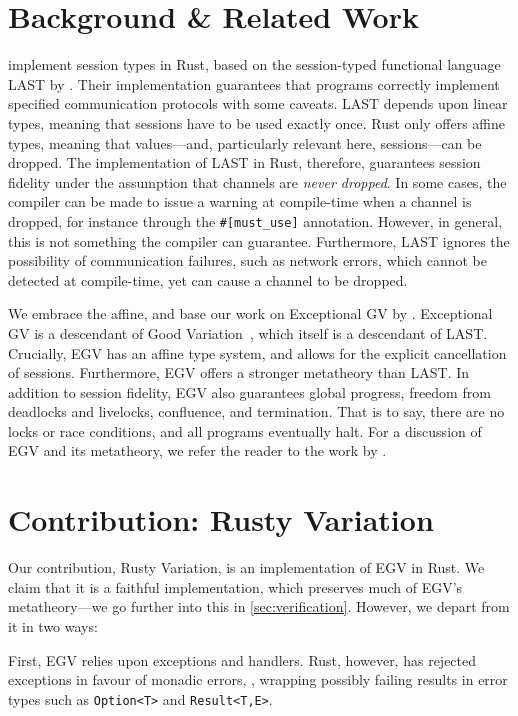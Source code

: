 \documentclass[sigconf,natbib=false]{acmart}
\begin{document}
\section{Background \& Related Work}\label{sec:background}
\Textcite{jespersen2015} implement session types in Rust, based on the session-typed functional language LAST by \textcite{gay2009}. Their implementation guarantees that programs correctly implement specified communication protocols with some caveats. LAST depends upon linear types, meaning that sessions have to be used exactly once. Rust only offers affine types, meaning that  values---and, particularly relevant here, sessions---can be dropped. The implementation of LAST in Rust, therefore, guarantees session fidelity under the assumption that channels are \emph{never dropped}. In some cases, the compiler can be made to issue a warning at compile-time when a channel is dropped, for instance through the \lstinline{#[must_use]} annotation. However, in general, this is not something the compiler can guarantee. Furthermore, LAST ignores the possibility of communication failures, such as network errors, which cannot be detected at compile-time, yet can cause a channel to be dropped.

We embrace the affine, and base our work on Exceptional GV by \textcite[EGV]{fowler2019}. Exceptional GV is a descendant of Good Variation~\parencite[GV]{wadler2012}, which itself is a descendant of LAST. Crucially, EGV has an affine type system, and allows for the explicit cancellation of sessions. Furthermore, EGV offers a stronger metatheory than LAST. In addition to session fidelity, EGV also guarantees global progress, freedom from deadlocks and livelocks, confluence, and termination. That is to say, there are no locks or race conditions, and all programs eventually halt. For a discussion of EGV and its metatheory, we refer the reader to the work by \textcite{fowler2019}.

\section{Contribution: Rusty Variation}\label{sec:contribution}
Our contribution, Rusty Variation, is an implementation of EGV in Rust. We claim that it is a faithful implementation, which preserves much of EGV's metatheory---we go further into this in \cref{sec:verification}. However, we depart from it in two ways:

First, EGV relies upon exceptions and handlers. Rust, however, has rejected exceptions in favour of monadic errors, \ie, wrapping possibly failing results in error types such as \lstinline{Option<T>} and \lstinline{Result<T,E>}.
\end{document}
